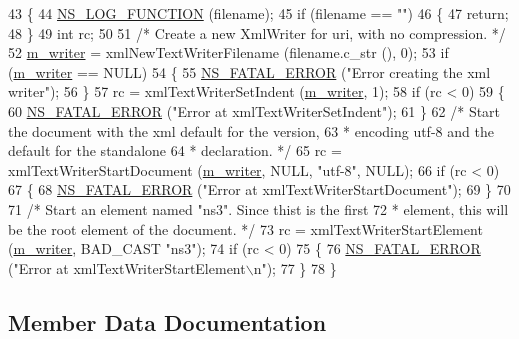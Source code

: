 \begin{DoxyCode}
43 \{
44   \hyperlink{log-macros-disabled_8h_a90b90d5bad1f39cb1b64923ea94c0761}{NS\_LOG\_FUNCTION} (filename);
45   \textcolor{keywordflow}{if} (filename == \textcolor{stringliteral}{""})
46     \{
47       \textcolor{keywordflow}{return};
48     \}
49   \textcolor{keywordtype}{int} rc;
50 
51   \textcolor{comment}{/* Create a new XmlWriter for uri, with no compression. */}
52   \hyperlink{classns3_1_1XmlConfigSave_a838ec47c15d124d23133a8e633c40397}{m\_writer} = xmlNewTextWriterFilename (filename.c\_str (), 0);
53   \textcolor{keywordflow}{if} (\hyperlink{classns3_1_1XmlConfigSave_a838ec47c15d124d23133a8e633c40397}{m\_writer} == NULL) 
54     \{
55       \hyperlink{group__fatal_ga5131d5e3f75d7d4cbfd706ac456fdc85}{NS\_FATAL\_ERROR} (\textcolor{stringliteral}{"Error creating the xml writer"});
56     \}
57   rc = xmlTextWriterSetIndent (\hyperlink{classns3_1_1XmlConfigSave_a838ec47c15d124d23133a8e633c40397}{m\_writer}, 1);
58   \textcolor{keywordflow}{if} (rc < 0)
59     \{
60       \hyperlink{group__fatal_ga5131d5e3f75d7d4cbfd706ac456fdc85}{NS\_FATAL\_ERROR} (\textcolor{stringliteral}{"Error at xmlTextWriterSetIndent"});
61     \}
62   \textcolor{comment}{/* Start the document with the xml default for the version,}
63 \textcolor{comment}{   * encoding utf-8 and the default for the standalone}
64 \textcolor{comment}{   * declaration. */}
65   rc = xmlTextWriterStartDocument (\hyperlink{classns3_1_1XmlConfigSave_a838ec47c15d124d23133a8e633c40397}{m\_writer}, NULL, \textcolor{stringliteral}{"utf-8"}, NULL);
66   \textcolor{keywordflow}{if} (rc < 0) 
67     \{
68       \hyperlink{group__fatal_ga5131d5e3f75d7d4cbfd706ac456fdc85}{NS\_FATAL\_ERROR} (\textcolor{stringliteral}{"Error at xmlTextWriterStartDocument"});
69     \}
70 
71   \textcolor{comment}{/* Start an element named "ns3". Since thist is the first}
72 \textcolor{comment}{   * element, this will be the root element of the document. */}
73   rc = xmlTextWriterStartElement (\hyperlink{classns3_1_1XmlConfigSave_a838ec47c15d124d23133a8e633c40397}{m\_writer}, BAD\_CAST \textcolor{stringliteral}{"ns3"});
74   \textcolor{keywordflow}{if} (rc < 0) 
75     \{
76       \hyperlink{group__fatal_ga5131d5e3f75d7d4cbfd706ac456fdc85}{NS\_FATAL\_ERROR} (\textcolor{stringliteral}{"Error at xmlTextWriterStartElement\(\backslash\)n"});
77     \}
78 \}
\end{DoxyCode}


\subsection{Member Data Documentation}
